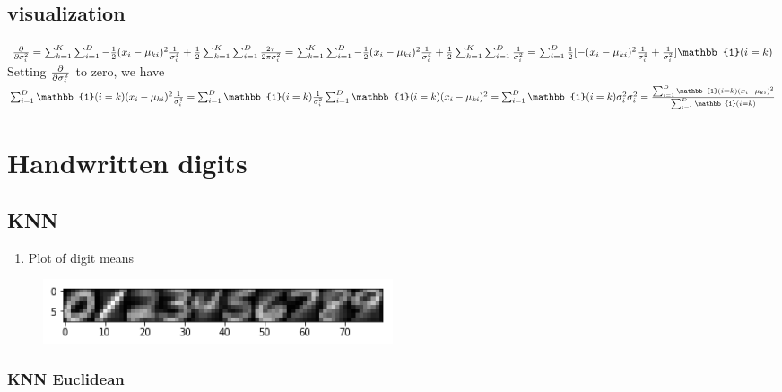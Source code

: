 \documentclass[letterpaper]{article}
\begin{document}
\subsection{visualization}
$
\pdv{}{\sigma_{i} ^2} = \sum_{k = 1}^{K} \sum_{i = 1}^{D} - \frac{1}{2}(x_{i} - \mu_{ki})^2 \frac{1}{\sigma_{i} ^4} + \frac{1}{2}\sum_{k = 1}^{K} \sum_{i = 1}^{D} \frac{2 \pi}{2\pi \sigma_{i} ^2}\\
=  \sum_{k = 1}^{K} \sum_{i = 1}^{D} - \frac{1}{2}(x_{i} - \mu_{ki})^2 \frac{1}{\sigma_{i} ^4} + \frac{1}{2}\sum_{k = 1}^{K} \sum_{i = 1}^{D} \frac{1}{ \sigma_{i} ^2}\\
 =  \sum_{i = 1}^{D} \frac{1}{2} [ -(x_{i} - \mu_{ki})^2 \frac{1}{\sigma_{i} ^4} + \frac{1}{\sigma_{i} ^2}]{\mathbb{1} ( i = k)}\\
 $
Setting $\pdv{}{\sigma_{i} ^2}$ to zero, we have\\
$
\sum_{i = 1}^{D} {\mathbb{1} ( i = k)} (x_{i} - \mu_{ki})^2 \frac{1}{\sigma_{i} ^4}
= \sum_{i=1}^{D} {\mathbb{1} ( i = k)} \frac{1}{\sigma_{i} ^2}\\
\sum_{i = 1}^{D} {\mathbb{1} ( i = k)} (x_{i} - \mu_{ki})^2 
= \sum_{i=1}^{D} {\mathbb{1} ( i = k)} \sigma_{i} ^2\\
\sigma_{i} ^2 = \frac{\sum_{i = 1}^{D} {\mathbb{1} ( i = k)} (x_{i} - \mu_{ki})^2}{\sum_{i=1}^{D} {\mathbb{1} ( i = k)}}
$

\section{Handwritten digits}
\subsection{KNN}
\begin{enumerate}
\item Plot of digit means
\end{enumerate}

\begin{figure}[H]
\centering
\includegraphics[width=0.5\textwidth]{q2_0_nums.png}
\caption{\label{}}
\end{figure}



\subsubsection{KNN Euclidean}
\end{document}
